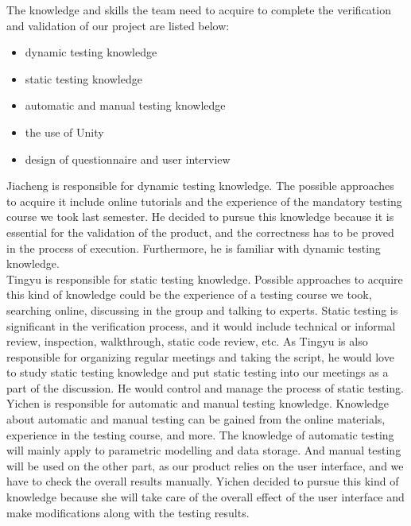 \documentclass[12pt, titlepage]{article}
\begin{document}
The knowledge and skills the team need to acquire to complete the verification and validation of our project are listed below:
\begin{itemize}
    \item dynamic testing knowledge
    \item static testing knowledge
    \item automatic and manual testing knowledge
    \item the use of Unity
    \item design of questionnaire and user interview
\end{itemize}

Jiacheng is responsible for dynamic testing knowledge. The possible approaches to acquire it include online tutorials and the experience of the mandatory testing course we took last semester. He decided to pursue this knowledge because it is essential for the validation of the product, and the correctness has to be proved in the process of execution. Furthermore, he is familiar with dynamic testing knowledge.\\

Tingyu is responsible for static testing knowledge. Possible approaches to acquire this kind of knowledge could be the experience of a testing course we took, searching online, discussing in the group and talking to experts. Static testing is significant in the verification process, and it would include technical or informal review, inspection, walkthrough, static code review, etc. As Tingyu is also responsible for organizing regular meetings and taking the script, he would love to study static testing knowledge and put static testing into our meetings as a part of the discussion. He would control and manage the process of static testing.\\

Yichen is responsible for automatic and manual testing knowledge. Knowledge about automatic and manual testing can be gained from the online materials, experience in the testing course, and more. The knowledge of automatic testing will mainly apply to parametric modelling and data storage. And manual testing will be used on the other part, as our product relies on the user interface, and we have to check the overall results manually. Yichen decided to pursue this kind of knowledge because she will take care of the overall effect of the user interface and make modifications along with the testing results. \\
\end{document}
